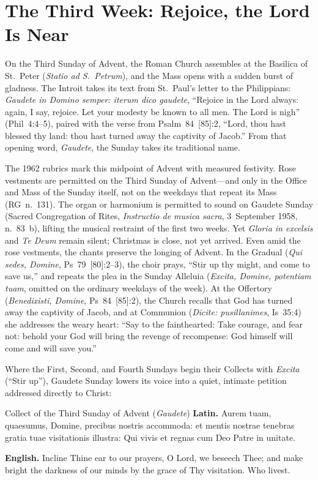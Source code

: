 \section{The Third Week: Rejoice, the Lord Is Near}\label{sec:week-3}

On the Third Sunday of Advent, the Roman Church assembles at the
Basilica of St.~Peter (\textit{Statio ad S.\ Petrum}), and the Mass
opens with a sudden burst of gladness. The Introit takes its text from
St.~Paul's letter to the Philippians: \textit{Gaudete in Domino semper:
iterum dico gaudete}, ``Rejoice in the Lord always: again, I say,
rejoice. Let your modesty be known to all men. The Lord is nigh''
(Phil~4:4--5), paired with the verse from Psalm~84~[85]:2, ``Lord, thou
hast blessed thy land: thou hast turned away the captivity of Jacob.''
From that opening word, \textit{Gaudete}, the Sunday takes its
traditional name.

The 1962 rubrics mark this midpoint of Advent with measured festivity.
Rose vestments are permitted on the Third Sunday of Advent---and only in
the Office and Mass of the Sunday itself, not on the weekdays that
repeat its Mass (RG~n.~131). The organ or harmonium is permitted to
sound on Gaudete Sunday (Sacred Congregation of Rites, \textit{Instructio
de musica sacra}, 3~September 1958, n.~83~b), lifting the musical
restraint of the first two weeks. Yet \textit{Gloria in excelsis} and
\textit{Te Deum} remain silent; Christmas is close, not yet arrived.
Even amid the rose vestments, the chants preserve the longing of
Advent. In the Gradual (\textit{Qui sedes, Domine}, Ps~79~[80]:2--3),
the choir prays, ``Stir up thy might, and come to save us,'' and repeats
the plea in the Sunday Alleluia (\textit{Excita, Domine, potentiam
tuam}, omitted on the ordinary weekdays of the week). At the Offertory
(\textit{Benedixisti, Domine}, Ps~84~[85]:2), the Church recalls that
God has turned away the captivity of Jacob, and at Communion
(\textit{Dicite: pusillanimes}, Is~35:4) she addresses the weary heart:
``Say to the fainthearted: Take courage, and fear not: behold your God
will bring the revenge of recompense: God himself will come and will
save you.''

Where the First, Second, and Fourth Sundays begin their Collects with
\textit{Excita} (``Stir up''), Gaudete Sunday lowers its voice into a
quiet, intimate petition addressed directly to Christ:

\begin{massbox}{Collect of the Third Sunday of Advent (\textit{Gaudete})}
\textbf{Latin.} Aurem tuam, quaesumus, Domine, precibus nostris
accommoda: et mentis nostrae tenebras gratia tuae visitationis illustra:
Qui vivis et regnas cum Deo Patre in unitate.

\textbf{English.} Incline Thine ear to our prayers, O Lord, we beseech
Thee; and make bright the darkness of our minds by the grace of Thy
visitation. Who livest.
\end{massbox}

